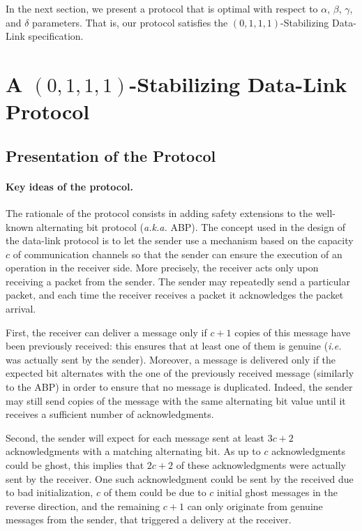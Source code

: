 \documentclass[11pt]{article}
\begin{document}
In the next section, we present a protocol that is optimal with respect to $\alpha$, $\beta$, $\gamma$, and $\delta$ parameters. That is, our protocol satisfies the $(0,1,1,1)$-Stabilizing Data-Link specification.

\section{A $(0,1,1,1)$-Stabilizing Data-Link Protocol}\label{sec:solution}

\subsection{Presentation of the Protocol}

\paragraph{Key ideas of the protocol.} The rationale of the protocol consists in adding safety extensions to the well-known alternating bit protocol (\emph{a.k.a.} ABP). The concept used in the design of the data-link protocol is to let the sender use a mechanism based on the capacity $c$ of communication channels so that the sender can ensure the execution of an operation in the receiver side. More precisely, the receiver acts only upon receiving a packet from the sender. The sender may repeatedly send a particular packet, and each time the receiver receives a packet it acknowledges the packet arrival.

First, the receiver can deliver a message only if $c+1$ copies of this message have been previously received: this ensures that at least one of them is genuine (\emph{i.e.} was actually sent by the sender). Moreover, a message is delivered only if the expected bit alternates with the one of the previously received message (similarly to the ABP) in order to ensure that no message is duplicated. Indeed, the sender may still send copies of the message with the same alternating bit value until it receives a sufficient number of acknowledgments. 

Second, the sender will expect for each message sent at least $3c+2$ acknowledgments with a matching alternating bit. As up to $c$ acknowledgments could be ghost, this implies that $2c+2$ of these acknowledgments were actually sent by the receiver. One such acknowledgment could be sent by the received due to bad initialization, $c$ of them could be due to $c$ initial ghost messages in the reverse direction, and the remaining $c+1$ can only originate from genuine messages from the sender, that triggered a delivery at the receiver. 
\end{document}
